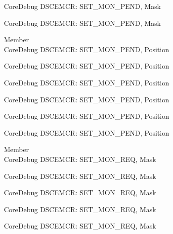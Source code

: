 \begin{DoxyRefList}
\label{deprecated__deprecated001188}%
%
Core\+Debug DSCEMCR\+: SET\+\_\+\+MON\+\_\+\+PEND, Mask 

\label{deprecated__deprecated001290}%
%
Core\+Debug DSCEMCR\+: SET\+\_\+\+MON\+\_\+\+PEND, Mask  
\item[Member \doxylink{group___c_m_s_i_s___s_c_b_ga644ae3a13bcb9f2a80326bc5824f1b28}{Core\+Debug\+\_\+\+DSCEMCR\+\_\+\+SET\+\_\+\+MON\+\_\+\+PEND\+\_\+\+Pos} ]\hfill \\
\label{deprecated__deprecated000077}%
%
Core\+Debug DSCEMCR\+: SET\+\_\+\+MON\+\_\+\+PEND, Position 

\label{deprecated__deprecated000528}%
%
Core\+Debug DSCEMCR\+: SET\+\_\+\+MON\+\_\+\+PEND, Position 

\label{deprecated__deprecated000630}%
%
Core\+Debug DSCEMCR\+: SET\+\_\+\+MON\+\_\+\+PEND, Position 

\label{deprecated__deprecated000736}%
%
Core\+Debug DSCEMCR\+: SET\+\_\+\+MON\+\_\+\+PEND, Position 

\label{deprecated__deprecated001187}%
%
Core\+Debug DSCEMCR\+: SET\+\_\+\+MON\+\_\+\+PEND, Position 

\label{deprecated__deprecated001289}%
%
Core\+Debug DSCEMCR\+: SET\+\_\+\+MON\+\_\+\+PEND, Position  
\item[Member \doxylink{group___c_m_s_i_s___s_c_b_ga73d8960abbd67eeda64f27a77ed7baf2}{Core\+Debug\+\_\+\+DSCEMCR\+\_\+\+SET\+\_\+\+MON\+\_\+\+REQ\+\_\+\+Msk} ]\hfill \\
\label{deprecated__deprecated000076}%
%
Core\+Debug DSCEMCR\+: SET\+\_\+\+MON\+\_\+\+REQ, Mask 

\label{deprecated__deprecated000527}%
%
Core\+Debug DSCEMCR\+: SET\+\_\+\+MON\+\_\+\+REQ, Mask 

\label{deprecated__deprecated000629}%
%
Core\+Debug DSCEMCR\+: SET\+\_\+\+MON\+\_\+\+REQ, Mask 

\label{deprecated__deprecated000735}%
%
Core\+Debug DSCEMCR\+: SET\+\_\+\+MON\+\_\+\+REQ, Mask 

\label{deprecated__deprecated001186}%
%
Core\+Debug DSCEMCR\+: SET\+\_\+\+MON\+\_\+\+REQ, Mask 


\end{DoxyRefList}
